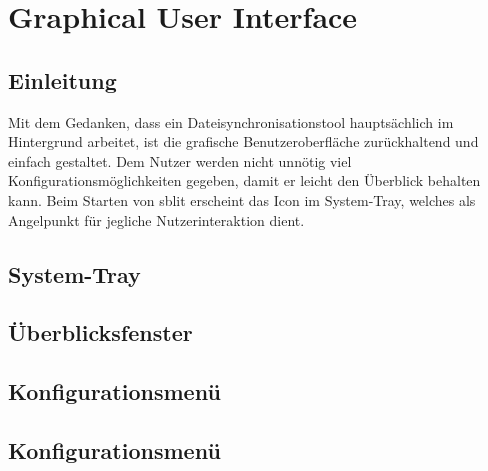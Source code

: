 \chapter{Graphical User Interface}\label{GUI}
\renewcommand{\kapitelautor}{Autor: Andreas Novak}

\section{Einleitung}
Mit dem Gedanken, dass ein Dateisynchronisationstool hauptsächlich im
Hintergrund arbeitet, ist die grafische Benutzeroberfläche zurückhaltend und
einfach gestaltet. Dem Nutzer werden nicht unnötig viel
Konfigurationsmöglichkeiten gegeben, damit er leicht den Überblick behalten
kann. Beim Starten von sblit erscheint das Icon im System-Tray, welches als
Angelpunkt für jegliche Nutzerinteraktion dient.

\section{System-Tray}\label{Systemtray}


\section{Überblicksfenster}\label{Überblicksfenster}


\section{Konfigurationsmenü}\label{Konfigurationsmenü}


\section{Konfigurationsmenü}\label{SWT}

